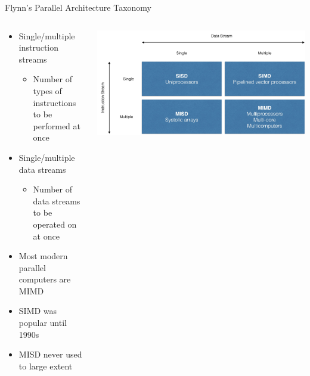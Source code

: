 \begin{frame}{Flynn’s Parallel Architecture Taxonomy}
\begin{columns}
\begin{column}{0.5\textwidth}
\begin{itemize}
\item Single/multiple instruction streams
\begin{itemize}
\item Number of types of instructions to be performed at once
\end{itemize}
\item Single/multiple data streams
\begin{itemize}
\item Number of data streams to be operated on at once
\end{itemize}
\item Most modern parallel computers are MIMD
\item SIMD was popular until 1990s
\item MISD never used to large extent
\end{itemize}
\end{column}
\begin{column}{0.5\textwidth}
\begin{center}
\includegraphics[width=\textwidth]{figures/flynn_taxonomy.jpg}
\end{center}
\end{column}
\end{columns}
\end{frame}

